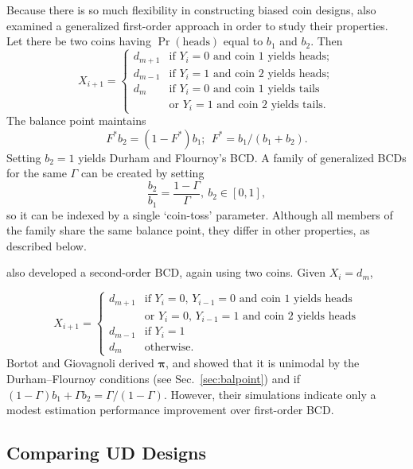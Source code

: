 Because there is so much flexibility in constructing biased coin designs, \cite{Bort:Giov:Upan:2005} also examined a generalized first-order approach in order to study their properties. Let there be two coins having $\Pr\left(\textrm{heads}\right)$ equal to $b_1$ and $b_2$. Then
\begin{equation}\label{eq:BortotCombo}
X_{i+1}=
\begin{cases}
d_{m+1} &\textrm{if $Y_i=0$ and coin 1 yields heads};\\
d_{m-1} &\textrm{if $Y_i=1$ and coin 2 yields heads};\\
d_{m} &\textrm{if $Y_i=0$ and coin 1 yields tails}\\
        & \textrm{or $Y_i=1$ and coin 2 yields tails.}
\end{cases}
\end{equation}
\noindent The balance point maintains
\begin{equation*}
F^*b_2=\left(1-F^*\right)b_1;\ \ F^*=b_1/(b_1+b_2).
\end{equation*}
\noindent Setting $b_2=1$ yields Durham and Flournoy's BCD. A family of generalized BCDs for the same $\Gamma$ can be created by setting $$\frac{b_2}{b_1}=\frac{1-\Gamma}{\Gamma},\ b_2\in [0,1],$$ so it can be indexed by a single `coin-toss' parameter. Although all members of the family share the same balance point, they differ in other properties, as described below.

\cite{Bort:Giov:Upan:2005} also developed a second-order BCD, again using two coins. Given $X_i=d_m$,

\begin{equation*}
X_{i+1}=
\begin{cases}
d_{m+1} &\textrm{if $Y_i=0$, $Y_{i-1}=0$ and coin 1 yields heads}\\
        &\textrm{or $Y_i=0$, $Y_{i-1}=1$ and coin 2 yields heads}\\
d_{m-1} &\textrm{if $Y_i=1$}\\
d_m &\textrm{otherwise.}
\end{cases}
\end{equation*}
%
Bortot and Giovagnoli derived $\boldsymbol{\pi}$, and showed that it is unimodal by the Durham--Flournoy conditions (see Sec.~\ref{sec:balpoint}) and if $(1-\Gamma )b_1+\Gamma b_2=\Gamma /(1-\Gamma )$. However, their simulations indicate only a modest estimation performance improvement over first-order BCD.

\subsection{Comparing UD Designs}

